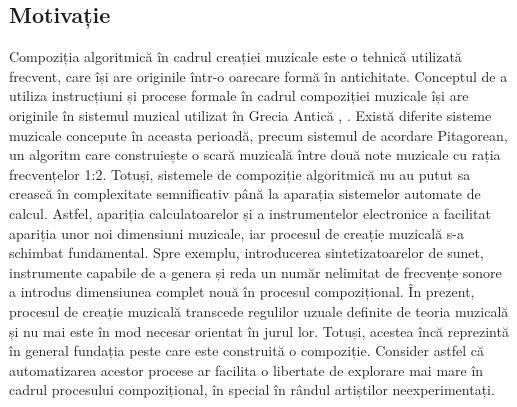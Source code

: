 \subsection{Motivație}
\noindent Compoziția algoritmică în cadrul creației muzicale este o tehnică utilizată frecvent, care își are originile într-o oarecare formă în antichitate. Conceptul de a utiliza instrucțiuni și procese formale în cadrul compoziției muzicale își are originile în sistemul muzical utilizat în Grecia Antică \cite{website:history}, \cite{history}. Există diferite sisteme muzicale concepute în aceasta perioadă, precum sistemul de acordare Pitagorean, un algoritm care construiește o scară muzicală între două note muzicale cu rația frecvențelor 1:2. Totuși, sistemele de compoziție algoritmică nu au putut sa crească în complexitate semnificativ până la aparația sistemelor automate de calcul. Astfel, apariția calculatoarelor și a instrumentelor electronice a facilitat apariția unor noi dimensiuni muzicale, iar procesul de creație muzicală s-a schimbat fundamental. Spre exemplu, introducerea sintetizatoarelor de sunet, instrumente capabile de a genera și reda un număr nelimitat de frecvențe sonore a introdus dimensiunea complet nouă în procesul compozițional. În prezent, procesul de creație muzicală transcede regulilor uzuale definite de teoria muzicală și nu mai este în mod necesar orientat în jurul lor. Totuși, acestea încă reprezintă în general fundația peste care este construită o compoziție. Consider astfel că automatizarea acestor procese ar facilita o libertate de explorare mai mare în cadrul procesului compozițional, în special în rândul artiștilor neexperimentați.
